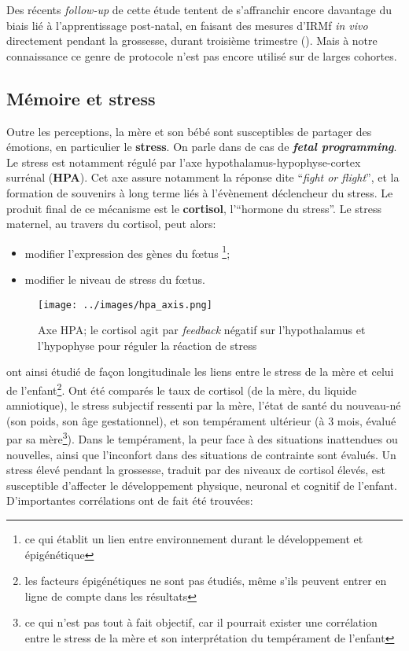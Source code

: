 \documentclass[french]{article}
\begin{document}
				Des récents \textit{follow-up} de cette étude tentent de s'affranchir encore davantage du biais lié à l'apprentissage post-natal, en faisant des mesures d'IRMf \textit{in vivo} directement pendant la grossesse, durant troisième trimestre (\cite{jardri2012}). Mais à notre connaissance ce genre de protocole n'est pas encore utilisé sur de larges cohortes.
				
			\subsection{Mémoire et stress}\label{stress}
				Outre les perceptions, la mère et son bébé sont susceptibles de partager des émotions, en particulier le \textbf{stress}. On parle dans de cas de \textit{\textbf{fetal programming}}. Le stress est notamment régulé par l'axe hypothalamus-hypophyse-cortex surrénal (\textbf{HPA}). Cet axe assure notamment la réponse dite ``\textit{fight or flight}'', et la formation de souvenirs à long terme liés à l'évènement déclencheur du stress. Le produit final de ce mécanisme est le \textbf{cortisol}, l'``hormone du stress''. Le stress maternel, au travers du cortisol, peut alors:
				\begin{itemize}
					\item modifier l'expression des gènes du fœtus \footnote{ce qui établit un lien entre environnement durant le développement et épigénétique};
					\item modifier le niveau de stress du fœtus.
				\end{itemize} \vspace{3mm}
				\begin{figure}[H]
					\centering
					\texttt{[image: ../images/hpa\_axis.png]}
					\caption{Axe HPA; le cortisol agit par \textit{feedback} négatif sur l'hypothalamus et l'hypophyse pour réguler la réaction de stress}
					\label{fig:hpa}
				\end{figure}
				\cite{baibazarova2013} ont ainsi étudié de façon longitudinale les liens entre le stress de la mère et celui de l'enfant\footnote{les facteurs épigénétiques ne sont pas étudiés, même s'ils peuvent entrer en ligne de compte dans les résultats}. Ont été comparés le taux de cortisol (de la mère, du liquide amniotique), le stress subjectif ressenti par la mère, l'état de santé du nouveau-né (son poids, son âge gestationnel), et son tempérament ultérieur (à 3 mois, évalué par sa mère\footnote{ce qui n'est pas tout à fait objectif, car il pourrait exister une corrélation entre le stress de la mère et son interprétation du tempérament de l'enfant}). Dans le tempérament, la peur face à des situations inattendues ou nouvelles, ainsi que l'inconfort dans des situations de contrainte sont évalués. Un stress élevé pendant la grossesse, traduit par des niveaux de cortisol élevés, est susceptible d'affecter le développement physique, neuronal et cognitif de l'enfant. D'importantes corrélations ont de fait été trouvées:
\end{document}
